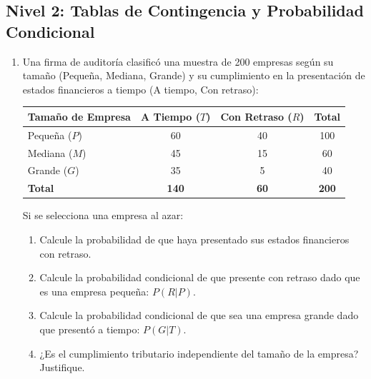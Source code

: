 \subsection*{Nivel 2: Tablas de Contingencia y Probabilidad Condicional}
\begin{enumerate}[resume]
    \item Una firma de auditoría clasificó una muestra de 200 empresas según su tamaño (Pequeña, Mediana, Grande) y su cumplimiento en la presentación de estados financieros a tiempo (A tiempo, Con retraso):
    \begin{center}
    \small
    \begin{tabular}{l|cc|c}
    \toprule
    \textbf{Tamaño de Empresa} & \textbf{A Tiempo ($T$)} & \textbf{Con Retraso ($R$)} & \textbf{Total} \\
    \midrule
    Pequeña ($P$) & 60 & 40 & 100 \\
    Mediana ($M$) & 45 & 15 & 60 \\
    Grande ($G$) & 35 & 5 & 40 \\
    \midrule
    \textbf{Total} & \textbf{140} & \textbf{60} & \textbf{200} \\
    \bottomrule
    \end{tabular}
    \end{center}
    Si se selecciona una empresa al azar:
    \begin{enumerate}[label=\alph*)]
        \item Calcule la probabilidad de que haya presentado sus estados financieros con retraso.
        \item Calcule la probabilidad condicional de que presente con retraso dado que es una empresa pequeña: $P(R|P)$.
        \item Calcule la probabilidad condicional de que sea una empresa grande dado que presentó a tiempo: $P(G|T)$.
        \item ¿Es el cumplimiento tributario independiente del tamaño de la empresa? Justifique.
    \end{enumerate}
\end{enumerate}

